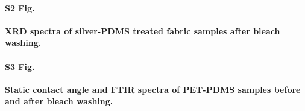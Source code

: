 \documentclass[10pt,letterpaper]{article}
\begin{document}
\paragraph*{S2 Fig.}
\label{S2_Fig}
{\bf XRD spectra of silver-PDMS treated fabric samples after bleach washing.}

\paragraph*{S3 Fig.}
\label{S3_Fig}
{\bf Static contact angle and FTIR spectra of PET-PDMS samples before and after bleach washing.}



\end{document}
